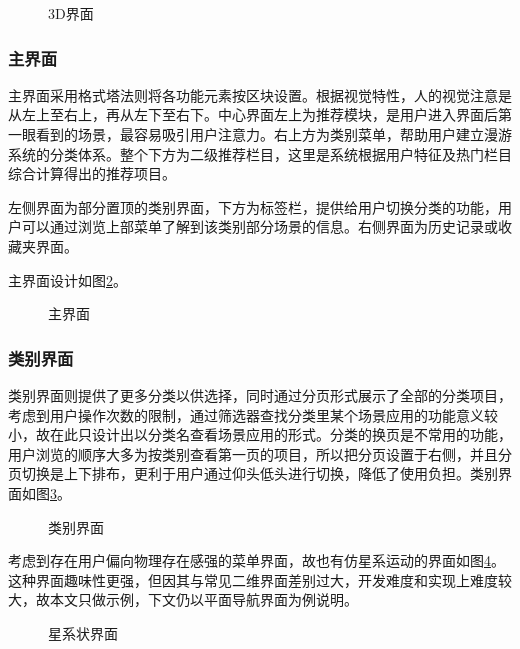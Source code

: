 \begin{figure}[htp]
\centering
{}
\caption{3D界面}
\label{fig:d-03}
\end{figure}

\subsubsection{主界面}
主界面采用格式塔法则将各功能元素按区块设置。根据视觉特性，人的视觉注意是从左上至右上，再从左下至右下。中心界面左上为推荐模块，是用户进入界面后第一眼看到的场景，最容易吸引用户注意力。右上方为类别菜单，帮助用户建立漫游系统的分类体系。整个下方为二级推荐栏目，这里是系统根据用户特征及热门栏目综合计算得出的推荐项目。

左侧界面为部分置顶的类别界面，下方为标签栏，提供给用户切换分类的功能，用户可以通过浏览上部菜单了解到该类别部分场景的信息。右侧界面为历史记录或收藏夹界面。

主界面设计如图\ref{fig:d-01}。

\begin{figure}[htp]
\centering
{}
\caption{主界面}
\label{fig:d-01}
\end{figure}

\subsubsection{类别界面}
类别界面则提供了更多分类以供选择，同时通过分页形式展示了全部的分类项目，考虑到用户操作次数的限制，通过筛选器查找分类里某个场景应用的功能意义较小，故在此只设计出以分类名查看场景应用的形式。分类的换页是不常用的功能，用户浏览的顺序大多为按类别查看第一页的项目，所以把分页设置于右侧，并且分页切换是上下排布，更利于用户通过仰头低头进行切换，降低了使用负担。类别界面如图\ref{fig:d-06}。

\begin{figure}[htp]
\centering
{}
\caption{类别界面}
\label{fig:d-06}
\end{figure}

考虑到存在用户偏向物理存在感强的菜单界面，故也有仿星系运动的界面如图\ref{fig:d-02}。这种界面趣味性更强，但因其与常见二维界面差别过大，开发难度和实现上难度较大，故本文只做示例，下文仍以平面导航界面为例说明。

\begin{figure}[htp]
\centering
{}
\caption{星系状界面}
\label{fig:d-02}
\end{figure}

